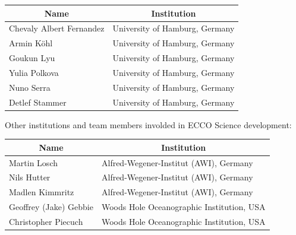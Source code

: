 \begin{center}
\begin{tabular}{m{} m{} }
    \multicolumn{1}{c}{\textbf{Name}} & \multicolumn{1}{c}{\textbf{Institution}} \\ \hline
    Chevaly Albert Fernandez & University of Hamburg, Germany \\ \hline
    Armin Köhl & University of Hamburg, Germany \\ \hline
    Goukun Lyu & University of Hamburg, Germany \\ \hline
    Yulia Polkova & University of Hamburg, Germany \\ \hline
    Nuno Serra & University of Hamburg, Germany \\ \hline
    Detlef Stammer & University of Hamburg, Germany \\ \hline
\end{tabular}
\end{center}


\vspace{.25cm}
\begin{center}
Other institutions and team members involded in ECCO Science development:
\end{center}

\vspace{.25cm}
\begin{center}
\begin{tabular}{m{} m{} }
    \multicolumn{1}{c}{\textbf{Name}} & \multicolumn{1}{c}{\textbf{Institution}} \\ \hline
    Martin Losch & Alfred-Wegener-Institut (AWI), Germany\\ \hline
    Nils Hutter & Alfred-Wegener-Institut (AWI), Germany\\ \hline
    Madlen Kimmritz & Alfred-Wegener-Institut (AWI), Germany\\ \hline
    Geoffrey (Jake) Gebbie & Woods Hole Oceanographic Institution, USA\\ \hline
    Christopher Piecuch & Woods Hole Oceanographic Institution, USA\\ \hline
\end{tabular}
\end{center}



